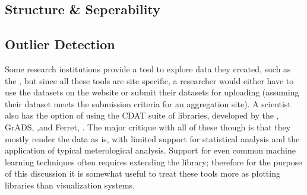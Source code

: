 \subsection{Structure & Seperability}


\subsection{Outlier Detection}
Some research institutions provide a tool to explore data they created, such as the \cite{src:esrlpsd}, but since all these tools are site specific, a researcher would either have to use the datasets on the website or submit their datasets for uploading 
(assuming their dataset meets the submission criteria for an aggregation site). A scientist also has the option of using the CDAT suite of libraries, developed by the \cite{WilliamsEtAl13}, GrADS, \cite{src:grads},and Ferret, \cite{src:HankinEtAl96}. The major critique with all of these though is that they mostly render the data as is, with limited support for statistical analysis and the application of typical meterological analysis. Support for even common machine learning techniques often requires extending the library; therefore for the purpose of this discussion it is somewhat useful to treat these tools more as plotting libraries than visualization systems. %
